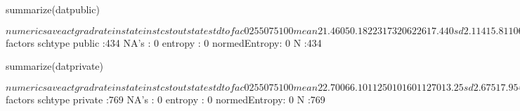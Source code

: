 \begin{Schunk}
\begin{Sinput}
 summarize(datpublic)
\end{Sinput}
\begin{Soutput}
$numerics
      aveact gradrate instate  instcst outstate stdtofac
0%    16.000     8.00     480     1834     1044    6.700
25%   20.000    39.00    1681     5265     4738   15.120
50%   21.000    50.00    2100     6414     6114   17.600
75%   23.000    59.75    2679     8046     7439   19.600
100%  28.000   100.00   14320    46480    15730   29.500
mean  21.460    50.18    2231     7320     6226   17.440
sd     2.114    15.81    1064     4170     2162    3.525
var    4.470   250.10 1132000 17390000  4672000   12.420
NA's 197.000     0.00      22        8       12    0.000
N    434.000   434.00     434      434      434  434.000

$factors
          schtype   
 public       :434  
 NA's         :  0  
 entropy      :  0  
 normedEntropy:  0  
 N            :434  
\end{Soutput}
\begin{Sinput}
 summarize(datprivate)
\end{Sinput}
\begin{Soutput}
$numerics
      aveact gradrate  instate  instcst outstate stdtofac
0%    11.000    15.00     1254     3019     2340     2.50
25%   21.000    54.00     8564     7051     8571    11.10
50%   22.000    67.00    10800     8694    10800    12.80
75%   24.000    79.00    13590    11220    13590    14.70
100%  31.000   100.00    25750    62470    25750    91.80
mean  22.700    66.10    11250    10160    11270    13.25
sd     2.675    17.95     4011     5819     3967     4.72
var    7.157   322.00 16090000 33870000 15740000    22.27
NA's 347.000     0.00        6       17        5     0.00
N    769.000   769.00      769      769      769   769.00

$factors
          schtype   
 private      :769  
 NA's         :  0  
 entropy      :  0  
 normedEntropy:  0  
 N            :769  
\end{Soutput}
\end{Schunk}
